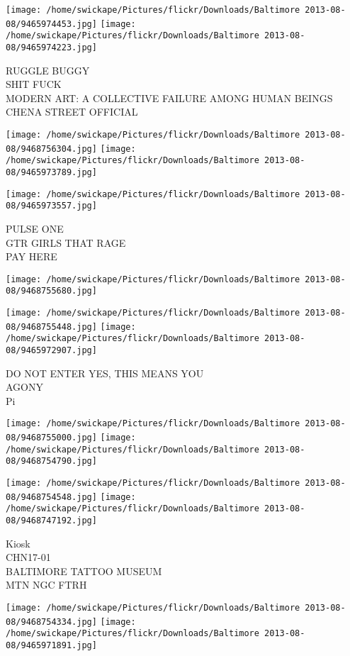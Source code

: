 \documentclass[10pt,letterpaper]{article}
\begin{document}
\texttt{[image: /home/swickape/Pictures/flickr/Downloads/Baltimore 2013-08-08/9465974453.jpg]}
\texttt{[image: /home/swickape/Pictures/flickr/Downloads/Baltimore 2013-08-08/9465974223.jpg]}

RUGGLE BUGGY\\
SHIT FUCK\\
MODERN ART: A COLLECTIVE FAILURE AMONG HUMAN BEINGS\\
CHENA STREET OFFICIAL
\pagebreak

\texttt{[image: /home/swickape/Pictures/flickr/Downloads/Baltimore 2013-08-08/9468756304.jpg]}
\texttt{[image: /home/swickape/Pictures/flickr/Downloads/Baltimore 2013-08-08/9465973789.jpg]}

\texttt{[image: /home/swickape/Pictures/flickr/Downloads/Baltimore 2013-08-08/9465973557.jpg]}

PULSE ONE\\
GTR GIRLS THAT RAGE\\
PAY HERE
\pagebreak

\texttt{[image: /home/swickape/Pictures/flickr/Downloads/Baltimore 2013-08-08/9468755680.jpg]}

\vspace{0.25in}
\texttt{[image: /home/swickape/Pictures/flickr/Downloads/Baltimore 2013-08-08/9468755448.jpg]}
\texttt{[image: /home/swickape/Pictures/flickr/Downloads/Baltimore 2013-08-08/9465972907.jpg]}

DO NOT ENTER YES, THIS MEANS YOU\\
AGONY\\
Pi
\pagebreak

\texttt{[image: /home/swickape/Pictures/flickr/Downloads/Baltimore 2013-08-08/9468755000.jpg]}
\texttt{[image: /home/swickape/Pictures/flickr/Downloads/Baltimore 2013-08-08/9468754790.jpg]}

\texttt{[image: /home/swickape/Pictures/flickr/Downloads/Baltimore 2013-08-08/9468754548.jpg]}
\texttt{[image: /home/swickape/Pictures/flickr/Downloads/Baltimore 2013-08-08/9468747192.jpg]}

Kiosk\\
CHN17{-}01\\
BALTIMORE TATTOO MUSEUM\\
MTN NGC FTRH
\pagebreak

\texttt{[image: /home/swickape/Pictures/flickr/Downloads/Baltimore 2013-08-08/9468754334.jpg]}
\texttt{[image: /home/swickape/Pictures/flickr/Downloads/Baltimore 2013-08-08/9465971891.jpg]}
\end{document}
